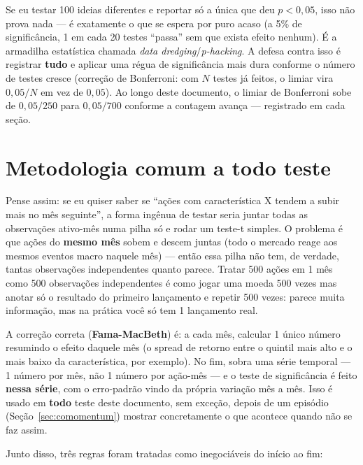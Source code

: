 \documentclass[11pt,a4paper]{article}
\begin{document}
Se eu testar 100 ideias diferentes e reportar só a única que deu
$p<0{,}05$, isso não prova nada --- é exatamente o que se espera por puro
acaso (a 5\% de significância, 1 em cada 20 testes ``passa'' sem que exista
efeito nenhum). É a armadilha estatística chamada \emph{data
dredging}/\emph{p-hacking}. A defesa contra isso é registrar \textbf{tudo}
e aplicar uma régua de significância mais dura conforme o número de testes
cresce (correção de Bonferroni: com $N$ testes já feitos, o limiar vira
$0{,}05/N$ em vez de $0{,}05$). Ao longo deste documento, o limiar de
Bonferroni sobe de $0{,}05/250$ para $0{,}05/700$ conforme a contagem
avança --- registrado em cada seção.

\section{Metodologia comum a todo teste}
\label{sec:metodologia}

Pense assim: se eu quiser saber se ``ações com característica X tendem a
subir mais no mês seguinte'', a forma ingênua de testar seria juntar todas
as observações ativo-mês numa pilha só e rodar um teste-t simples. O
problema é que ações do \textbf{mesmo mês} sobem e descem juntas (todo o
mercado reage aos mesmos eventos macro naquele mês) --- então essa pilha
não tem, de verdade, tantas observações independentes quanto parece.
Tratar 500 ações em 1 mês como 500 observações independentes é como jogar
uma moeda 500 vezes mas anotar só o resultado do primeiro lançamento e
repetir 500 vezes: parece muita informação, mas na prática você só tem 1
lançamento real.

A correção correta (\textbf{Fama-MacBeth}) é: a cada mês, calcular 1 único
número resumindo o efeito daquele mês (o spread de retorno entre o
quintil mais alto e o mais baixo da característica, por exemplo). No fim,
sobra uma série temporal --- 1 número por mês, não 1 número por ação-mês
--- e o teste de significância é feito \textbf{nessa série}, com o
erro-padrão vindo da própria variação mês a mês. Isso é usado em
\textbf{todo} teste deste documento, sem exceção, depois de um episódio
(Seção~\ref{sec:comomentum}) mostrar concretamente o que acontece quando
não se faz assim.

Junto disso, três regras foram tratadas como inegociáveis do início ao fim:
\end{document}
